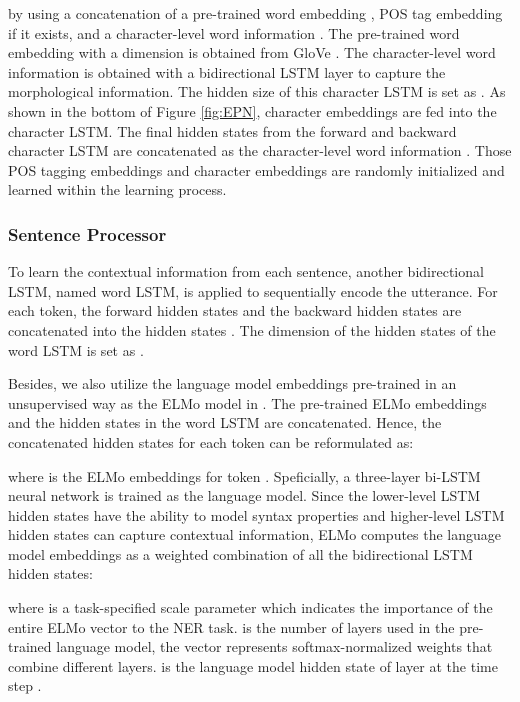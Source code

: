 \documentclass[11pt,a4paper]{article}
\begin{document}
\noindent by using a concatenation of a pre-trained word embedding , POS tag embedding  if it exists, and a character-level word information .
The pre-trained word embedding  with a dimension  is obtained from GloVe \cite{pennington2014glove}.
The character-level word information  is obtained with a bidirectional LSTM \cite{hochreiter1997long} layer to capture the morphological information. The hidden size of this character LSTM is set as .
As shown in the bottom of Figure \ref{fig:EPN}, character embeddings are fed into the character LSTM.
The final hidden states from the forward and backward character LSTM are concatenated as the character-level word information .
Those POS tagging embeddings and character embeddings are randomly initialized and learned within the learning process.

\subsubsection{Sentence Processor}
To learn the contextual information from each sentence, another bidirectional LSTM, named word LSTM, is applied to sequentially encode the utterance. 
For each token, the forward hidden states \scriptscriptstyle\rightarrow and the backward hidden states \scriptscriptstyle\leftarrow are concatenated into the hidden states .
The dimension of the hidden states of the word LSTM is set as .

Besides, we also utilize the language model embeddings pre-trained in an unsupervised way as the ELMo model in \citep{peters2018deep}. The pre-trained ELMo embeddings and the hidden states in the word LSTM  are concatenated.
Hence, the concatenated hidden states  for each token can be reformulated as:

where  is the ELMo embeddings for token . Speficially, a three-layer bi-LSTM neural network is trained as the language model. Since the lower-level LSTM hidden states have the ability to model syntax properties and higher-level LSTM hidden states can capture contextual information, ELMo computes the language model embeddings as a weighted combination of all the bidirectional LSTM hidden states:

where  is a task-specified scale parameter which indicates the importance of the entire ELMo vector to the NER task.  is the number of layers used in the pre-trained language model, the vector  represents softmax-normalized weights that combine different layers.  is the language model hidden state of layer  at the time step .
\end{document}

